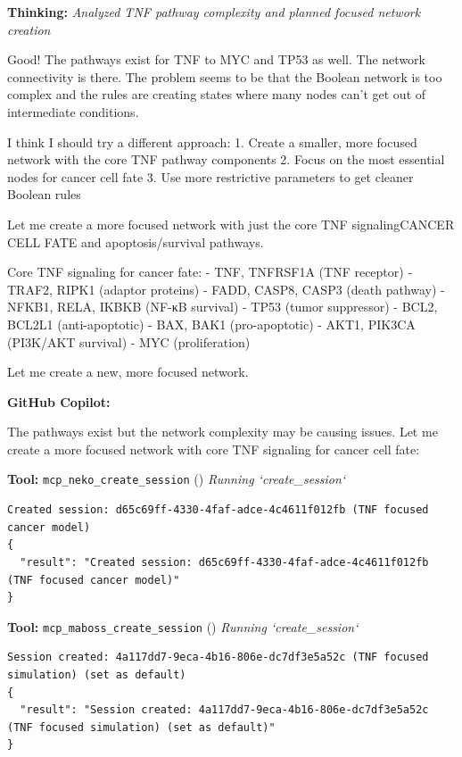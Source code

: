 \documentclass[11pt,a4paper]{article}
\begin{document}
\begin{thinkbox}
\textbf{Thinking:} \textit{Analyzed TNF pathway complexity and planned focused network creation}

Good! The pathways exist for TNF to MYC and TP53 as well. The network connectivity is there. The problem seems to be that the Boolean network is too complex and the rules are creating states where many nodes can't get out of intermediate conditions.

I think I should try a different approach:
1. Create a smaller, more focused network with the core TNF pathway components
2. Focus on the most essential nodes for cancer cell fate
3. Use more restrictive parameters to get cleaner Boolean rules

Let me create a more focused network with just the core TNF signalingCANCER CELL FATE and apoptosis/survival pathways.

Core TNF signaling for cancer fate:
- TNF, TNFRSF1A (TNF receptor)
- TRAF2, RIPK1 (adaptor proteins)
- FADD, CASP8, CASP3 (death pathway) 
- NFKB1, RELA, IKBKB (NF-κB survival)
- TP53 (tumor suppressor)
- BCL2, BCL2L1 (anti-apoptotic)
- BAX, BAK1 (pro-apoptotic)
- AKT1, PIK3CA (PI3K/AKT survival)
- MYC (proliferation)

Let me create a new, more focused network.

\end{thinkbox}
\begin{copilotbox}
\textbf{GitHub Copilot:}

The pathways exist but the network complexity may be causing issues. Let me create a more focused network with core TNF signaling for cancer cell fate:

\end{copilotbox}
\begin{toolokbox}
\textbf{Tool:} \texttt{mcp\_neko\_create\_session} (\checkmark)
\textit{Running `create\_session`}
\begin{lstlisting}
Created session: d65c69ff-4330-4faf-adce-4c4611f012fb (TNF focused cancer model)
{
  "result": "Created session: d65c69ff-4330-4faf-adce-4c4611f012fb (TNF focused cancer model)"
}
\end{lstlisting}
\end{toolokbox}
\begin{toolokbox}
\textbf{Tool:} \texttt{mcp\_maboss\_create\_session} (\checkmark)
\textit{Running `create\_session`}
\begin{lstlisting}
Session created: 4a117dd7-9eca-4b16-806e-dc7df3e5a52c (TNF focused simulation) (set as default)
{
  "result": "Session created: 4a117dd7-9eca-4b16-806e-dc7df3e5a52c (TNF focused simulation) (set as default)"
}
\end{lstlisting}
\end{toolokbox}
\end{document}
